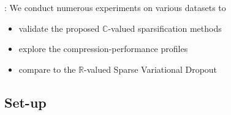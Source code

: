 \documentclass{beamer}
\newcommand{\real}{\mathbb{R}}
\newcommand{\cplx}{\mathbb{C}}
\begin{document}
\begin{frame}[c]{\insertsection: \insertsubsection}
  We conduct numerous experiments on various datasets to
  \begin{itemize}
    \item validate the proposed $\cplx$-valued sparsification methods
    \item explore the compression-performance profiles
    \item compare to the $\real$-valued Sparse Variational Dropout
  \end{itemize}

\end{frame}


\subsection{Set-up} %
\label{sub:details}
\end{document}

